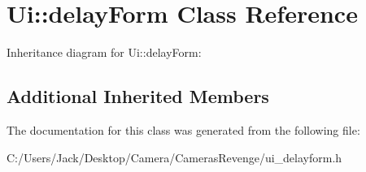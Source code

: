 \hypertarget{class_ui_1_1delay_form}{\section{Ui\+:\+:delay\+Form Class Reference}
\label{class_ui_1_1delay_form}
}


Inheritance diagram for Ui\+:\+:delay\+Form\+:
\subsection*{Additional Inherited Members}


The documentation for this class was generated from the following file\+:\begin{DoxyCompactItemize}
\item 
C\+:/\+Users/\+Jack/\+Desktop/\+Camera/\+Cameras\+Revenge/ui\+\_\+delayform.\+h\end{DoxyCompactItemize}
